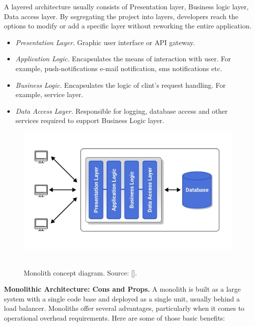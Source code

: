 A layered architecture usually consists of Presentation layer, Business logic layer, Data access layer.
By segregating the project into layers, developers reach the options to modify or add a specific layer
without reworking the entire application.

\begin{itemize}
    \item \textit{Presentation Layer.} Graphic user interface or API gateway.
    \item \textit{Application Logic.} Encapsulates the means of interaction with user.
    For example, push-notifications e-mail notification, sms notifications etc.
    \item \textit{Business Logic.} Encapsulates the logic of clint's request handling.
    For example, service layer.
    \item \textit{Data Access Layer.} Responsible for logging, database access and other services required to support
    Business Logic layer.
\end{itemize}

\begin{figure}[H]
    \centering
    \includegraphics[width=1\textwidth]{Pictures/03_Monolith_concept_diagram}
    ~\caption{Monolith concept diagram. Source: [\cite{mango2021figma}].}\label{fig:figure2}
\end{figure}

\textbf{Monolithic Architecture: Cons and Props.} A monolith is built as a large system with a single code base and
deployed as a single unit, usually behind a load balancer.
Monoliths offer several advantages, particularly when it comes to operational overhead requirements.
Here are some of those basic benefits:

